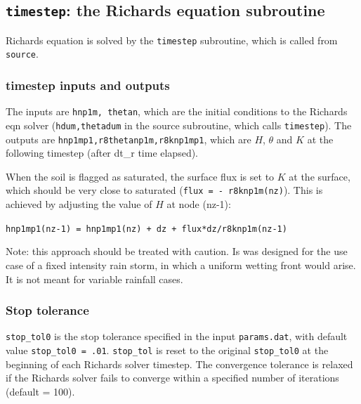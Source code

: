 \documentclass{article}
\newcommand{\code}[1]{\texttt{#1}}
\begin{document}
\subsection{\code{timestep}: the Richards equation subroutine }

Richards equation is solved by the \code{timestep} subroutine, which is called from \code{source}.
	
\subsubsection*{timestep inputs and outputs }
The inputs are \code{hnp1m, thetan}, which are the initial conditions to the Richards eqn solver (\code{hdum,thetadum} in the source subroutine, which calls \code{timestep}).  
The outputs are  \code{hnp1mp1,r8thetanp1m,r8knp1mp1}, which are  $H$, $\theta$ and $K$ at the following timestep (after dt\_r  time elapsed).



When the soil is flagged as saturated,  the surface flux is set to $K$ at the surface, which should be very close to saturated (\code{flux  = - r8knp1m(nz)}).  This is achieved by adjusting the value of $H$ at node (nz-1):
\begin{center}
\code{hnp1mp1(nz-1) = hnp1mp1(nz) + dz + flux*dz/r8knp1m(nz-1)}	
\end{center}

Note: this approach should be treated with caution.  Is was designed for the use case of a fixed intensity rain storm, in which a uniform wetting front would arise.  It is not meant for variable rainfall cases.

\subsubsection*{Stop tolerance }
\code{stop\_tol0} is the stop tolerance specified in the input \code{params.dat}, with default value \code{stop\_tol0 = .01}.  
\code{stop\_tol} is reset to the original \code{stop\_tol0}  at the beginning of each Richards solver timestep.  The convergence tolerance  is relaxed if the Richards solver fails to converge within a specified number of iterations (default = 100).

%
\end{document}
